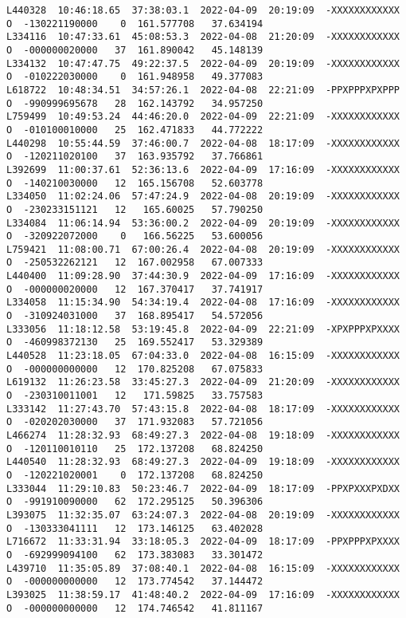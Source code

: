 \documentclass[12pt]{article}
\begin{document}
\begin{verbatim}
L440328  10:46:18.65  37:38:03.1  2022-04-09  20:19:09  -XXXXXXXXXXXX  O  -130221190000    0  161.577708   37.634194
L334116  10:47:33.61  45:08:53.3  2022-04-08  21:20:09  -XXXXXXXXXXXX  O  -000000020000   37  161.890042   45.148139
L334132  10:47:47.75  49:22:37.5  2022-04-09  20:19:09  -XXXXXXXXXXXX  O  -010222030000    0  161.948958   49.377083
L618722  10:48:34.51  34:57:26.1  2022-04-08  22:21:09  -PPXPPPXPXPPP  O  -990999695678   28  162.143792   34.957250
L759499  10:49:53.24  44:46:20.0  2022-04-09  22:21:09  -XXXXXXXXXXXX  O  -010100010000   25  162.471833   44.772222
L440298  10:55:44.59  37:46:00.7  2022-04-08  18:17:09  -XXXXXXXXXXXX  O  -120211020100   37  163.935792   37.766861
L392699  11:00:37.61  52:36:13.6  2022-04-09  17:16:09  -XXXXXXXXXXXX  O  -140210030000   12  165.156708   52.603778
L334050  11:02:24.06  57:47:24.9  2022-04-08  20:19:09  -XXXXXXXXXXXX  O  -230233151121   12   165.60025   57.790250
L334084  11:06:14.94  53:36:00.2  2022-04-09  20:19:09  -XXXXXXXXXXXX  O  -320922072000    0   166.56225   53.600056
L759421  11:08:00.71  67:00:26.4  2022-04-08  20:19:09  -XXXXXXXXXXXX  O  -250532262121   12  167.002958   67.007333
L440400  11:09:28.90  37:44:30.9  2022-04-09  17:16:09  -XXXXXXXXXXXX  O  -000000020000   12  167.370417   37.741917
L334058  11:15:34.90  54:34:19.4  2022-04-08  17:16:09  -XXXXXXXXXXXX  O  -310924031000   37  168.895417   54.572056
L333056  11:18:12.58  53:19:45.8  2022-04-09  22:21:09  -XPXPPPXPXXXX  O  -460998372130   25  169.552417   53.329389
L440528  11:23:18.05  67:04:33.0  2022-04-08  16:15:09  -XXXXXXXXXXXX  O  -000000000000   12  170.825208   67.075833
L619132  11:26:23.58  33:45:27.3  2022-04-09  21:20:09  -XXXXXXXXXXXX  O  -230310011001   12   171.59825   33.757583
L333142  11:27:43.70  57:43:15.8  2022-04-08  18:17:09  -XXXXXXXXXXXX  O  -020202030000   37  171.932083   57.721056
L466274  11:28:32.93  68:49:27.3  2022-04-08  19:18:09  -XXXXXXXXXXXX  O  -120110010110   25  172.137208   68.824250
L440540  11:28:32.93  68:49:27.3  2022-04-09  19:18:09  -XXXXXXXXXXXX  O  -120221020001    0  172.137208   68.824250
L333044  11:29:10.83  50:23:46.7  2022-04-09  18:17:09  -PPXPXXXPXDXX  O  -991910090000   62  172.295125   50.396306
L393075  11:32:35.07  63:24:07.3  2022-04-08  20:19:09  -XXXXXXXXXXXX  O  -130333041111   12  173.146125   63.402028
L716672  11:33:31.94  33:18:05.3  2022-04-09  18:17:09  -PPXPPPXPXXXX  O  -692999094100   62  173.383083   33.301472
L439710  11:35:05.89  37:08:40.1  2022-04-08  16:15:09  -XXXXXXXXXXXX  O  -000000000000   12  173.774542   37.144472
L393025  11:38:59.17  41:48:40.2  2022-04-09  17:16:09  -XXXXXXXXXXXX  O  -000000000000   12  174.746542   41.811167

\end{verbatim}
\end{document}
